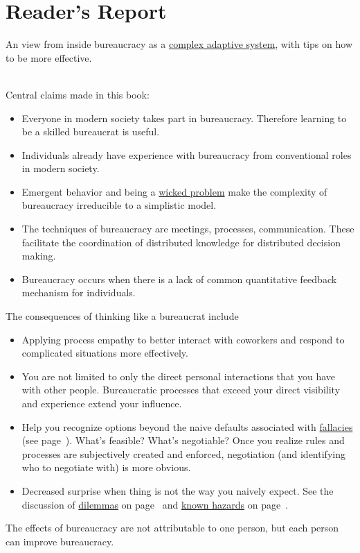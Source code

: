 \section{Reader's Report\label{sec:reader-report}}
An view from inside bureaucracy as a \href{https://en.wikipedia.org/wiki/Complexity_theory_and_organizations}{complex adaptive system}, 
with tips on how to be more effective. 

\ \\
Central claims made in this book:
\begin{itemize}
    \item Everyone in modern society takes part in \gls{bureaucracy}. Therefore learning to be a skilled \gls{bureaucrat} is useful.
    \item Individuals already have experience with bureaucracy from conventional roles in modern society. 
    \item Emergent behavior and being a \href{https://en.wikipedia.org/wiki/Wicked_problem}{wicked problem} 
    make the complexity of bureaucracy irreducible to a simplistic model.
    \item The techniques of bureaucracy are meetings, processes, communication. These facilitate the coordination of distributed knowledge for distributed decision making.  
    \item Bureaucracy occurs when there is a lack of common quantitative feedback mechanism for individuals.
\end{itemize}
The consequences of thinking like a bureaucrat include
\begin{itemize}
    \item Applying \gls{process empathy} to better interact with coworkers and respond to complicated situations more effectively.
    \item You are not limited to only the direct personal interactions that you have with other people. Bureaucratic processes that exceed your direct visibility and experience extend your influence.
    \item Help you recognize options beyond the naive defaults associated with \hyperref[sec:fallacies]{fallacies}
    (see page~\pageref{sec:fallacies}). 
    What's feasible? What's negotiable? Once you realize rules and processes are subjectively created and enforced, negotiation (and identifying who to negotiate with) is more obvious.
    \item Decreased surprise when thing is not the way you naively expect. See the discussion of \hyperref[sec:dilemma-trilemma]{dilemmas}
    on page~\pageref{sec:dilemma-trilemma} 
    and 
    \hyperref[sec:unavoidable-hazards]{known hazards}
    on page~\pageref{sec:unavoidable-hazards}.
\end{itemize}


The effects of bureaucracy are not attributable to one person, but each person can improve bureaucracy.